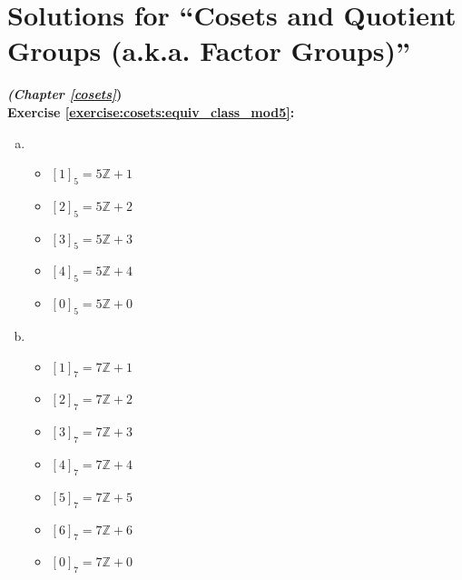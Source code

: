 
\section{Solutions for ``Cosets and Quotient Groups (a.k.a. Factor Groups)''}
\noindent\textbf{\textit{(Chapter \ref{cosets}})}\bigskip
\\
\textbf{Exercise \ref{exercise:cosets:equiv_class_mod5}:}
\begin{multicols}{2}
\begin{enumerate}[(a)]
\item
	\begin{itemize}
	\item
	$[1]_5 = 5{\mathbb Z} + 1$
	\item
	$[2]_5 = 5{\mathbb Z} + 2$
	\item
	$[3]_5 = 5{\mathbb Z} + 3$
	\item
	$[4]_5 = 5{\mathbb Z} + 4$
	\item
	$[0]_5 = 5{\mathbb Z} + 0$
	\end{itemize}
\columnbreak	
\item
	\begin{itemize}
	\item
	$[1]_7 = 7{\mathbb Z} + 1$
	\item
	$[2]_7 = 7{\mathbb Z} + 2$
	\item
	$[3]_7 = 7{\mathbb Z} + 3$
	\item
	$[4]_7 = 7{\mathbb Z} + 4$
	\item
	$[5]_7 = 7{\mathbb Z} + 5$
	\item
	$[6]_7 = 7{\mathbb Z} + 6$
	\item
	$[0]_7 = 7{\mathbb Z} + 0$
	\end{itemize}
\end{enumerate}
\end{multicols}

